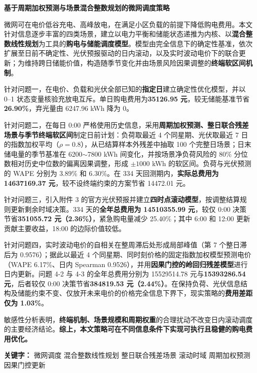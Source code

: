 \documentclass[fontset=windows, 12pt, a4paper]{ctexart}
\newcommand{\papertitle}[1]{%
  \thispagestyle{empty}%
  \begin{center}
    {\fontsize{17.3pt}{22pt}\bfseries #1}
  \end{center}
  \vspace{1em}
}
\newcommand{\abstractcn}[2]{%
  \thispagestyle{empty}%
  {\centering {\fontsize{14pt}{17pt}\bfseries 摘要}\par}%
  \vspace{0.4em}%
  #1\par
  \vspace{0.6em}%
  {\heiti\bfseries 关键字：}#2\par
  \newpage
}
\begin{document}
\papertitle{基于周期加权预测与场景混合整数规划的微网调度策略}

\abstractcn{%
微网可在电价低谷充电、高峰放电，在满足小区负载的前提下降低购电费用。本文针对信息逐步丰富的四类场景，建立以电力平衡和储能状态递推为内核、以\textbf{混合整数线性规划}为工具的\textbf{购电与储能调度模型}。模型由完全信息下的确定性基准，依次扩展至日前不确定性、光伏预报驱动的日内滚动，以及实时波动电价下的联合更新；为维持跨日储能价值，构造随季节变化并由场景风险因果调整的\textbf{终端软区间机制}。

针对问题一，在电价、负载和光伏全部已知的\textbf{指定日}建立确定性优化模型，并以 0--1 状态变量核验充放电互斥。单日购电费用为\textbf{35126.95 元}，较无储能基准节省\textbf{26.90\%}，弃光量由 6247.96 kWh 降为 0。

针对问题二，在每日 0:00 严格使用历史信息，采用\textbf{周期加权预测、整日联合残差场景与季节终端软区间}制定日前计划：负荷取最近 4 个同星期、光伏取最近 7 日的指数加权平均（$\rho=0.8$），从已结算样本外残差中抽取 100 个完整日场景；日末储电量的季节基准在 6200$\sim$7800 kWh 间变化，并按场景净负荷风险的 80\% 分位数相对历史中位数的偏离因果调整，形成 $\pm1000$ kWh 的软区间。负荷与光伏预测的 WAPE 分别为 3.89\% 和 6.30\%。在 334 天回测期内，\textbf{实际总费用为 14637169.37 元}，较不设终端约束的方案节省 14472.01 元。

针对问题三，引入附件 3 的官方光伏预报并建立\textbf{四时点滚动模型}，按调整结算规则更新剩余时域决策。334 天的\textbf{全年总费用为 14510355.99 元}，较仅 0:00 决策节省\textbf{351055.72 元（2.36\%）}，紧急购电量减少 25.40\%；其中 6:00 和 12:00 更新贡献主要收益，18:00 的边际价值较低。

针对问题四，实时波动电价的自相关在整周滞后处形成局部峰值（第 7 个整日滞后为 0.9576）；据此以最近 4 个同星期、同时刻价格的固定指数加权模型预测电价（WAPE 6.17\%、日内 Spearman 0.9526），并用\textbf{因果门控的岭回归残差模型}进行日内更新。问题 4-2 与 4-3 的全年总费用分别为 15529514.78 元与\textbf{15393286.54 元}，后者较仅 0:00 决策节省\textbf{384819.53 元（2.44\%）}。在保持负荷、光伏信息结构及储能约束不变、仅放开未来电价的价格完全信息下界下，现实策略的\textbf{费用差距仅为 1.03\%}。

敏感性分析表明，\textbf{终端机制、场景规模和周期权重}的合理扰动不改变日内滚动调度的主要经济结论。\textbf{综上，本文策略可在不同信息条件下实现可执行且稳健的购电费用优化。}%
}{%
微网调度 \quad 混合整数线性规划 \quad 整日联合残差场景 \quad 滚动时域 \quad 周期加权预测 \quad 因果门控更新%
}

\setcounter{page}{1}
\end{document}
